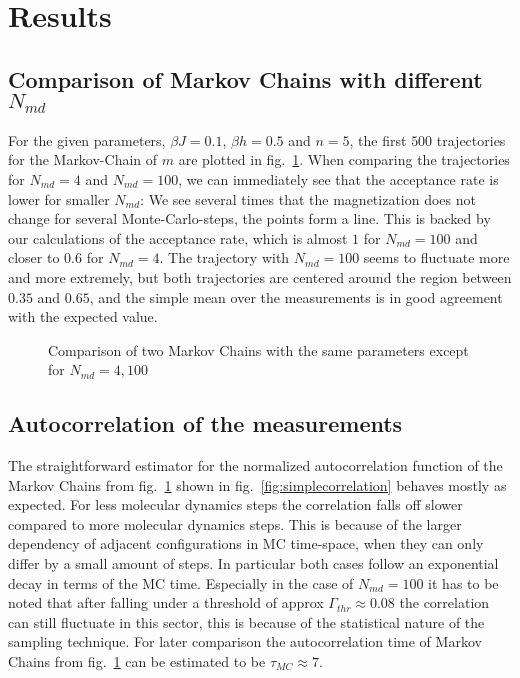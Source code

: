 \documentclass{scrartcl}
\begin{document}
\section{Results}

\subsection{Comparison of Markov Chains with different $N_{md}$}

For the given parameters, $\beta J=0.1$, $\beta h=0.5$ and $n=5$, the first $500$ trajectories for the Markov-Chain of $m$ are plotted in fig.~\ref{fig:markovchaincomparison}. When comparing the trajectories for $N_{md}=4$ and $N_{md}=100$, we can immediately see that the acceptance rate is lower for smaller $N_{md}$: We see several times that the magnetization does not change for several Monte-Carlo-steps, the points form a line. This is backed by our calculations of the acceptance rate, which is almost $1$ for $N_{md}=100$ and closer to $0.6$ for $N_{md}=4$. The trajectory with $N_{md}=100$ seems to fluctuate more and more extremely, but both trajectories are centered around the region between $0.35$ and $0.65$, and the simple mean over the measurements is in good agreement with the expected value.

\begin{figure}[htbp]
	
	\caption{Comparison of two Markov Chains with the same parameters except for $N_{md}=4, 100$}
	\label{fig:markovchaincomparison}
\end{figure}



\subsection{Autocorrelation of the measurements}
The straightforward estimator for the normalized autocorrelation function of the Markov Chains from fig.~\ref{fig:markovchaincomparison} shown in fig.~\ref{fig:simplecorrelation} behaves mostly as expected. For less molecular dynamics steps the correlation falls off slower compared to more molecular dynamics steps. This is because of the larger dependency of adjacent configurations in MC time-space, when they can only differ by a small amount of steps. In particular both cases follow an exponential decay in terms of the MC time. Especially in the case of $N_{md}=100$ it has to be noted that after falling under a threshold of approx $\Gamma_{thr}\approx0.08$ the correlation can still fluctuate in this sector, this is because of the statistical nature of the sampling technique. For later comparison the autocorrelation time of Markov Chains from fig.~\ref{fig:markovchaincomparison} can be estimated to be $\tau_{MC}\approx 7$. 
\end{document}
